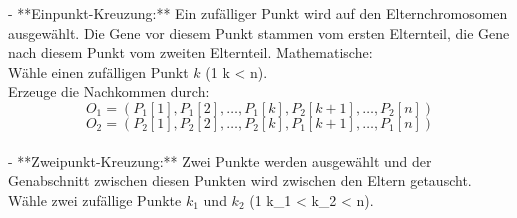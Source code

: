- **Einpunkt-Kreuzung:** Ein zufälliger Punkt wird auf den 
Elternchromosomen ausgewählt. Die Gene vor diesem Punkt 
stammen vom ersten Elternteil, die Gene nach diesem Punkt 
vom zweiten Elternteil. Mathematische:\\
Wähle einen zufälligen Punkt \( k \) (1 \leq k < n).\\
Erzeuge die Nachkommen durch:
\[ O_1 = (P_1[1], P_1[2], \ldots, P_1[k], P_2[k+1], \ldots, P_2[n]) \]
\[ O_2 = (P_2[1], P_2[2], \ldots, P_2[k], P_1[k+1], \ldots, P_1[n]) \]
\\
- **Zweipunkt-Kreuzung:** Zwei Punkte werden ausgewählt und 
der Genabschnitt zwischen diesen Punkten wird zwischen 
den Eltern getauscht.\\
Wähle zwei zufällige Punkte \( k_1 \) und \( k_2 \) (1 \leq k_1 < k_2 < n).\\
